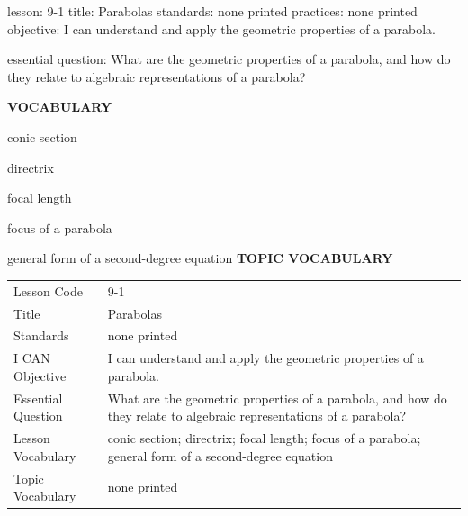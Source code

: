 \documentclass{article}
\newenvironment{lesson-meta}{}{}        %
\newcommand{\te}[1]{}                   %
\begin{document}
\begin{lesson-meta}
lesson: 9-1
title: Parabolas
standards: none printed
practices: none printed
objective: I can understand and apply the geometric properties of a parabola.

essential question: What are the geometric properties of a parabola, and how do they relate to algebraic representations of a parabola?

\textbf{VOCABULARY}
\item conic section
\item directrix
\item focal length
\item focus of a parabola
\item general form of a second-degree equation
\textbf{TOPIC VOCABULARY}
\te{No topic vocabulary list is printed on these pages.}
\begin{tabular}{ll}
Lesson Code & 9-1 \\
Title & Parabolas \\
Standards & none printed \\
I CAN Objective & I can understand and apply the geometric properties of a parabola. \\
Essential Question & What are the geometric properties of a parabola, and how do they relate to algebraic representations of a parabola? \\
Lesson Vocabulary & conic section; directrix; focal length; focus of a parabola; general form of a second-degree equation \\
Topic Vocabulary & none printed \\
\end{tabular}
\end{lesson-meta}
\end{document}

